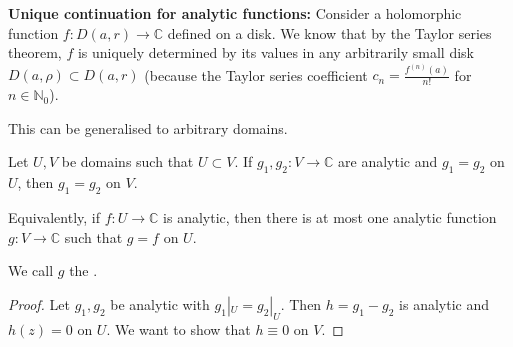 \documentclass[egregdoesnotlikesansseriftitles,a4paper]{scrartcl}
\begin{document}
\textbf{Unique continuation for analytic functions:}
Consider a holomorphic function $f: D (a,r)\rightarrow \mathbb{C}$ defined on a disk. We know that by the Taylor series theorem, $f$ is uniquely determined by its values in any arbitrarily small disk $D (a,\rho )\subset D (a,r)$ (because the Taylor series coefficient $c_{n}= \frac{f^{(n)}(a)}{n!}$ for $n \in \mathbb{N}_{0}$).

This can be generalised to arbitrary domains.
\begin{theorem}
      Let $U,V$ be domains such that $U \subset V$. If $g_1 ,g_2 : V \rightarrow \mathbb{C}$ are analytic and $g_1 =g_2 $ on $U$, then $g_1 =g_2 $ on $V$.

      Equivalently, if $f: U \rightarrow \mathbb{C}$ is analytic, then there is at most one analytic function $g: V \rightarrow \mathbb{C}$ such that $g=f$ on $U$.
      \begin{notation}
           We call $g$ the .
      \end{notation}
\end{theorem}
\begin{proof}
      Let $g_1 ,g_2 $ be analytic with $g_1 |_{U}=g_2 |_{U}$. Then $h=g_1 -g_2 $ is analytic and $h (z)=0$ on $U$. We want to show that $h\equiv 0$ on $V$.
\end{proof}
\end{document}
